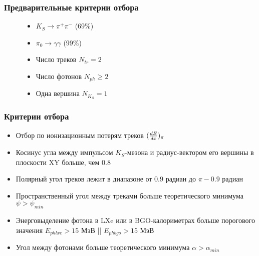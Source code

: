\documentclass[14pt, hyperref = {colorlinks}]{beamer}
\begin{document}
\begin{frame}\label{r}
\frametitle{Предварительные критерии отбора}
\begin{figure}[h]
\begin{minipage}[h]{0.59\linewidth}

\begin{itemize}
    \item $K_{S} \to \pi^{+} \pi^{-}$ (69\%)
    \item $\pi_{0} \to \gamma \gamma$ (99\%)
\end{itemize}
\begin{itemize}
  \item {Число треков $N_{tr} = 2$} 
  \item {Число фотонов $N_{ph} \geq 2$}
  \item {Одна вершина $N_{K_{S}} = 1$}
\end{itemize}
\end{minipage}
\begin{minipage}[h]{0.39\linewidth}
\end{minipage}
\end{figure}
{\tiny }\end{frame} 

\begin{frame}\label{r}
\frametitle{Критерии отбора}
\begin{itemize}
  \item {Отбор по ионизационным потерям треков {$({dE\over{dx}})_{\pi}$}} %
  \item {Косинус угла между импульсом $K_{S}$-мезона и радиус-вектором его вершины в плоскости XY больше, чем {$0.8$}}
  \item {Полярный угол треков лежит в диапазоне от $0.9$ радиан до $\pi-0.9$ радиан}
  \item {Пространственный угол между треками больше теоретического минимума {$\psi > \psi_{min}$}}
  \item {Энерговыделение фотона в LXe или в BGO-калориметрах больше порогового значения {$E_{phlxe} > 15$ МэВ || $E_{phbgo} > 15$ МэВ}}
  \item {Угол между фотонами больше теоретического минимума {$\alpha > \alpha_{min}$}}
\end{itemize}
\end{frame}
\end{document}
